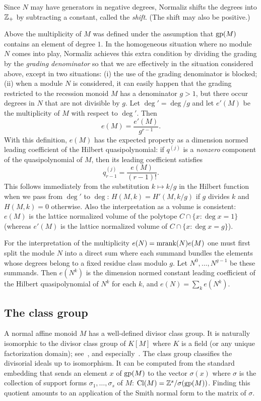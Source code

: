 Since $N$ may have generators in negative degrees, Normaliz shifts the degrees into ${\mathbb Z}_+$ by subtracting a constant, called the \emph{shift}. (The shift may also be positive.)

Above the multiplicity of $M$ was defined under the assumption that $\operatorname{gp}(M)$ contains an element of degree $1$. In the homogeneous situation where no module $N$ comes into play, Normaliz achieves this extra condition by dividing the grading by the \emph{grading denominator} so that we are effectively in the situation considered above, except in two situations:
(i) the use of the grading denominator is blocked; (ii) when a module $N$ is considered, it can easily happen that the grading restricted to the recession monoid $M$ has a denominator $g>1$, but there occur degrees in $N$ that are not divisible by $g$. Let $\deg'=\deg/g$ and let $e'(M)$ be the multiplicity of $M$ with respect to $\deg'$. Then
$$
e(M)=\frac{e'(M)}{g^{r-1}}.
$$
With this definition, $e(M)$ has the expected property as a dimension normed leading coefficient of the Hilbert quasipolynomial: if $q^{(j)}$ is a \emph{nonzero} component of the quasipolynomial of $M$, then its leading coefficient satisfies
$$
q_{r-1}^{(j)}=\frac{e(M)}{(r-1)!}.
$$
This follows immediately from the substitution $k\mapsto k/g$ in the Hilbert function when we pass from $\deg'$ to $\deg$: $H(M,k)=H'(M,k/g)$ if $g$ divides $k$ and $H(M,k)=0$ otherwise. Also the interpretation as a volume is consistent: $e(M)$ is the lattice normalized volume of the polytope $C\cap\{x:\deg x=1 \}$ (whereas $e'(M)$ is the lattice normalized volume of $C\cap\{x:\deg x=g \}$).

For the interpretation of the multiplicity $e(N)=\operatorname{mrank}(N)e(M)$ one must first split the module $N$ into a direct sum where each summand bundles the elements whose degrees belong to a fixed residue class modulo $g$. Let $N^0,\dots,N^{g-1}$ be these summands. Then $e(N^k)$ is the dimension normed constant leading coefficient of the Hilbert quasipolynomial of $N^k$ for each $k$, and $e(N)=\sum_k e(N^k)$.

\subsection{The class group}

A normal affine monoid $M$ has a well-defined divisor class group. It is naturally isomorphic to the divisor class group of $K[M]$ where $K$ is a field (or any unique factorization domain); see~\cite[Section~4.F]{BG}, and especially~\cite[Corollary~4.56]{BG}. The class group classifies the divisorial ideals up to isomorphism. It can be computed from the standard embedding that sends an element $x$ of $\operatorname{gp}(M)$ to the vector $\sigma(x)$ where $\sigma$ is the collection of support forms $\sigma_1,\dots,\sigma_s$ of $M$: $\operatorname{Cl}(M)={\mathbb Z}^s/\sigma(\operatorname{gp}(M))$. Finding this quotient amounts to an application of the Smith normal form to the matrix of $\sigma$.



